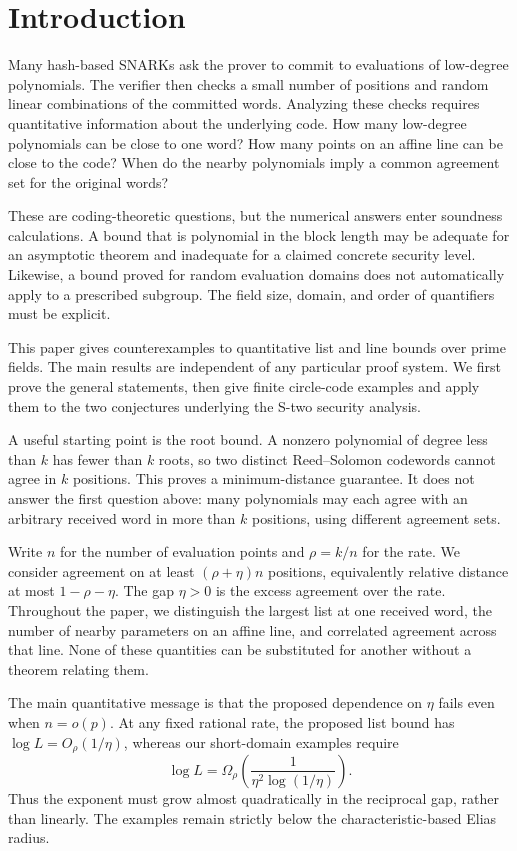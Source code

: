 \documentclass[11pt,letterpaper]{article}
\theoremstyle{definition}
\theoremstyle{remark}
\begin{document}
\section{Introduction}

Many hash-based SNARKs ask the prover to commit to evaluations of
low-degree polynomials. The verifier then checks a small number of
positions and random linear combinations of the committed words.
Analyzing these checks requires quantitative information about the
underlying code. How many low-degree polynomials can be close to one
word? How many points on an affine line can be close to the code?
When do the nearby polynomials imply a common agreement set for the
original words?

These are coding-theoretic questions, but the numerical answers enter
soundness calculations. A bound that is polynomial in the block length
may be adequate for an asymptotic theorem and inadequate for a claimed
concrete security level. Likewise, a bound proved for random evaluation
domains does not automatically apply to a prescribed subgroup. The
field size, domain, and order of quantifiers must be explicit.

This paper gives counterexamples to quantitative list and line bounds
over prime fields. The main results are independent of any particular
proof system. We first prove the general statements, then give finite
circle-code examples and apply them to the two conjectures underlying
the S-two security analysis.

A useful starting point is the root bound. A nonzero polynomial of
degree less than $k$ has fewer than $k$ roots, so two distinct
Reed--Solomon codewords cannot agree in $k$ positions. This proves a
minimum-distance guarantee. It does not answer the first question
above: many polynomials may each agree with an arbitrary received word
in more than $k$ positions, using different agreement sets.

Write $n$ for the number of evaluation points and $\rho=k/n$ for the
rate. We consider agreement on at least $(\rho+\eta)n$ positions,
equivalently relative distance at most $1-\rho-\eta$. The gap
$\eta>0$ is the excess agreement over the rate. Throughout the paper,
we distinguish the largest list at one received word, the number of
nearby parameters on an affine line, and correlated agreement across
that line. None of these quantities can be substituted for another
without a theorem relating them.

The main quantitative message is that the proposed dependence on
$\eta$ fails even when $n=o(p)$. At any fixed rational rate, the proposed
list bound has $\log L=O_\rho(1/\eta)$, whereas our short-domain examples
require
\[
 \log L=\Omega_\rho\!\left(
   \frac{1}{\eta^2\log(1/\eta)}\right).
\]
Thus the exponent must grow almost quadratically in the reciprocal
gap, rather than linearly. The examples remain strictly below the
characteristic-based Elias radius.
\end{document}
